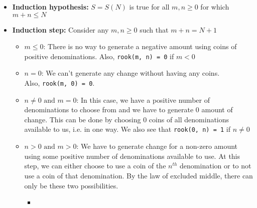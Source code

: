 \documentclass[answers]{exam}
\begin{document}
\begin{questions}
\begin{parts}
\begin{solution}
\begin{itemize}
{\begin{itemize}
                            \item{
                                \textbf{Induction hypothesis: } \(S = S(N)\) is true for all \(m, n \geq 0\) for which \(m + n \leq N\)
                            }

                            \item{
                                \textbf{Induction step: } Consider any \(m, n \geq 0\) such that \(m + n = N + 1\)
                                \begin{itemize}
                                    \item {
                                        \(m \leq 0\): There is no way to generate a negative amount using coins of positive denominations.
                                        Also, \lstinline{rook(m, n) = 0} if \(m < 0\)
                                    }
                                    \item {
                                        \(n = 0\): We can't generate any change without having any coins. \\
                                        Also, \lstinline{rook(m, 0) = 0}.
                                    }
                                    \item {
                                        \(n \neq 0 \text{ and } m = 0\): In this case, we have a positive number of denominations to choose
                                        from and we have to generate 0 amount of change. This can be done by choosing 0 coins of all denominations
                                        available to us, i.e. in one way.
                                        We also see that \lstinline{rook(0, n) = 1} if \(n \neq 0\)
                                    }
                                    \item {
                                        \(n  > 0 \text{ and } m > 0\): We have to generate change for a non-zero amount using some positive number
                                        of denominations available to use. At this step, we can either choose to use a coin of the \(n^{th}\)
                                        denomination or to not use a coin of that denomination. By the law of excluded middle, there can only be 
                                        these two possibilities.
                                        \begin{itemize}
                                            \item {
}
\end{itemize}}
\end{itemize}}
\end{itemize}}
\end{itemize}
\end{solution}
\end{parts}
\end{questions}
\end{document}
